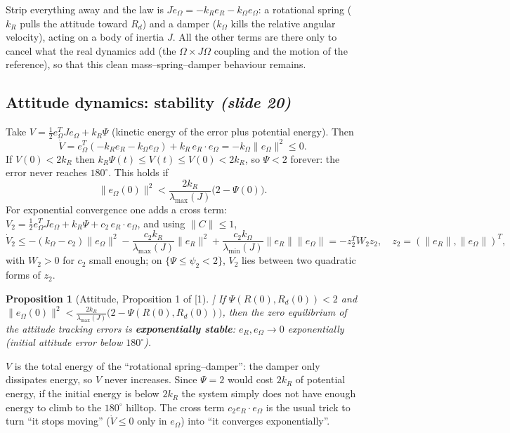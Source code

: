 \documentclass[11pt,a4paper]{article}
\newcommand{\eR}{e_R}
\newcommand{\eO}{e_\Omega}
\newcommand{\lmax}{\lambda_{\max}}
\newcommand{\lmin}{\lambda_{\min}}
\newcommand{\sli}[1]{\emph{(#1)}}
\theoremstyle{definition}
\theoremstyle{plain}
\newtheorem{proposition}[definition]{Proposition}
\theoremstyle{remark}
\begin{document}
\begin{intuition}
Strip everything away and the law is $J\dot\eO=-k_R\eR-k_\Omega\eO$: a rotational spring ($k_R$ pulls the attitude toward $R_d$) and a damper ($k_\Omega$ kills the relative angular velocity), acting on a body of inertia $J$. All the other terms are there only to cancel what the real dynamics add (the $\Omega\times J\Omega$ coupling and the motion of the reference), so that this clean mass--spring--damper behaviour remains.
\end{intuition}

\subsection{Attitude dynamics: stability \sli{slide 20}}

Take $V=\tfrac12\eO^TJ\eO+k_R\Psi$ (kinetic energy of the error plus potential energy). Then
\[
\dot V=\eO^T(-k_R\eR-k_\Omega\eO)+k_R\,\eR\cdot\eO=-k_\Omega\|\eO\|^2\le0 .
\]
If $V(0)<2k_R$ then $k_R\Psi(t)\le V(t)\le V(0)<2k_R$, so $\Psi<2$ forever: the error never reaches $180^\circ$. This holds if
\[
\|\eO(0)\|^2<\frac{2k_R}{\lmax(J)}\big(2-\Psi(0)\big).
\]
For exponential convergence one adds a cross term: $V_2=\tfrac12\eO^TJ\eO+k_R\Psi+c_2\,\eR\cdot\eO$, and using $\|C\|\le1$,
\[
\dot V_2\le-(k_\Omega-c_2)\|\eO\|^2-\frac{c_2k_R}{\lmax(J)}\|\eR\|^2+\frac{c_2k_\Omega}{\lmin(J)}\|\eR\|\|\eO\|=-z_2^TW_2z_2,\quad z_2=(\|\eR\|,\|\eO\|)^T ,
\]
with $W_2>0$ for $c_2$ small enough; on $\{\Psi\le\psi_2<2\}$, $V_2$ lies between two quadratic forms of $z_2$.

\begin{proposition}[Attitude, Proposition 1 of [1]]
If $\Psi(R(0),R_d(0))<2$ and $\|\eO(0)\|^2<\frac{2k_R}{\lmax(J)}\big(2-\Psi(R(0),R_d(0))\big)$, then the zero equilibrium of the attitude tracking errors is \textbf{exponentially stable}: $\eR,\eO\to0$ exponentially (initial attitude error below $180^\circ$).
\end{proposition}

\begin{intuition}
$V$ is the total energy of the ``rotational spring--damper'': the damper only dissipates energy, so $V$ never increases. Since $\Psi=2$ would cost $2k_R$ of potential energy, if the initial energy is below $2k_R$ the system simply does not have enough energy to climb to the $180^\circ$ hilltop. The cross term $c_2\eR\cdot\eO$ is the usual trick to turn ``it stops moving'' ($\dot V\le0$ only in $\eO$) into ``it converges exponentially''. 
\end{intuition}
\end{document}
